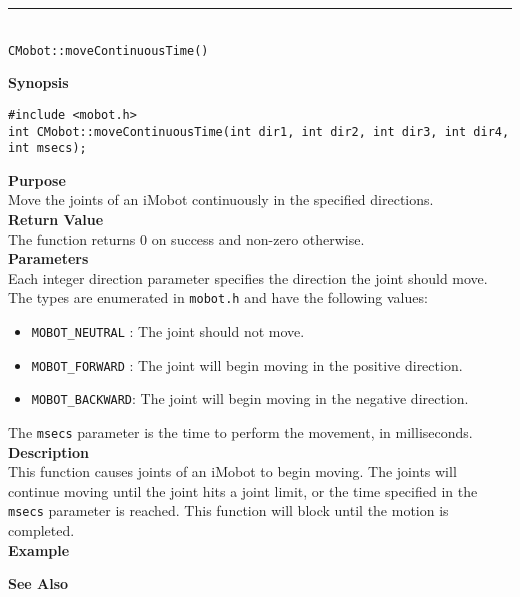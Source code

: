\noindent
\vspace{5pt}
\rule{4.5in}{0.015in}\\
\noindent
{\LARGE \texttt{CMobot::moveContinuousTime()}}\\
{}

\noindent
{\bf Synopsis}\\
\begin{verbatim}
#include <mobot.h>
int CMobot::moveContinuousTime(int dir1, int dir2, int dir3, int dir4, int msecs);
\end{verbatim}

\noindent
{\bf Purpose}\\
Move the joints of an iMobot continuously in the specified directions.\\

\noindent
{\bf Return Value}\\
The function returns 0 on success and non-zero otherwise.\\

\noindent
{\bf Parameters}\\
Each integer direction parameter specifies the direction the joint should move. The types
are enumerated in \texttt{mobot.h} and have the following values:
\begin{itemize}
\item \texttt{MOBOT\_NEUTRAL} : The joint should not move.
\item \texttt{MOBOT\_FORWARD} : The joint will begin moving in the positive direction.
\item \texttt{MOBOT\_BACKWARD}: The joint will begin moving in the negative direction.
\end{itemize}
The \texttt{msecs} parameter is the time to perform the movement, in milliseconds.
\\

\noindent
{\bf Description}\\
This function causes joints of an iMobot to begin moving. The joints will continue moving
until the joint hits a joint limit, or the time specified in the \texttt{msecs} parameter
is reached. This function will block until the motion is completed.\\

\noindent
{\bf Example}\\
\noindent

\noindent
{\bf See Also}\\

